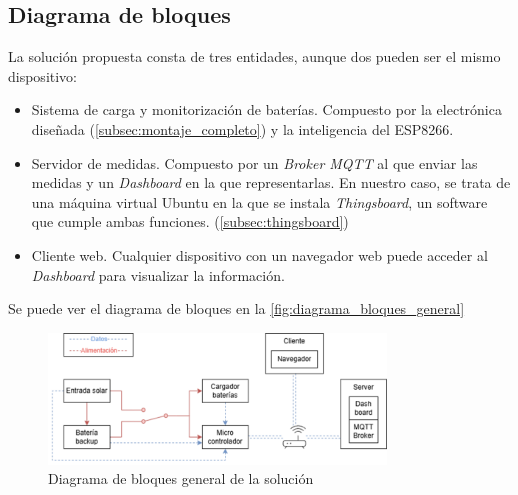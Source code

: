 \subsection{Diagrama de bloques}

La solución propuesta consta de tres entidades, aunque dos pueden ser el mismo dispositivo: \begin{itemize}
    \item Sistema de carga y monitorización de baterías. Compuesto por la electrónica diseñada (\autoref{subsec:montaje_completo}) y la inteligencia del ESP8266. 
    \item Servidor de medidas. Compuesto por un \textit{Broker MQTT} al que enviar las medidas y un \textit{Dashboard} en la que representarlas. En nuestro caso, se trata de una máquina virtual Ubuntu en la que se instala \textit{Thingsboard}, un software que cumple ambas funciones. (\autoref{subsec:thingsboard})
    \item Cliente web. Cualquier dispositivo con un navegador web puede acceder al \textit{Dashboard} para visualizar la información.
\end{itemize}

Se puede ver el diagrama de bloques en la \autoref{fig:diagrama_bloques_general}

\begin{figure}[h]
    \centering
    \includegraphics[width=0.8\textwidth]{images/2-hardware/bloquesGeneral.png}
    \caption{Diagrama de bloques general de la solución}
    \label{fig:diagrama_bloques_general}
\end{figure}
